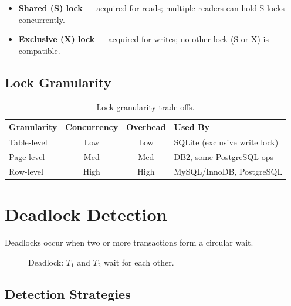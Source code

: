 \begin{itemize}[nosep]
  \item \textbf{Shared (S) lock} --- acquired for reads; multiple readers can hold S locks concurrently.
  \item \textbf{Exclusive (X) lock} --- acquired for writes; no other lock (S or X) is compatible.
\end{itemize}

\subsection{Lock Granularity}
\label{sec:lock-granularity}

\begin{table}[H]
\centering
\caption{Lock granularity trade-offs.}
\begin{tabular}{l c c p{6cm}}
\toprule
\textbf{Granularity} & \textbf{Concurrency} & \textbf{Overhead} & \textbf{Used By} \\
\midrule
Table-level   & Low  & Low  & SQLite (exclusive write lock) \\
Page-level    & Med  & Med  & DB2, some PostgreSQL ops \\
Row-level     & High & High & MySQL/InnoDB, PostgreSQL \\
\bottomrule
\end{tabular}
\end{table}

\section{Deadlock Detection}
\label{sec:deadlock}

Deadlocks occur when two or more transactions form a circular wait.

\begin{figure}[H]
\centering
{}
\caption{Deadlock: $T_1$ and $T_2$ wait for each other.}
\label{fig:deadlock}
\end{figure}

\subsection{Detection Strategies}

